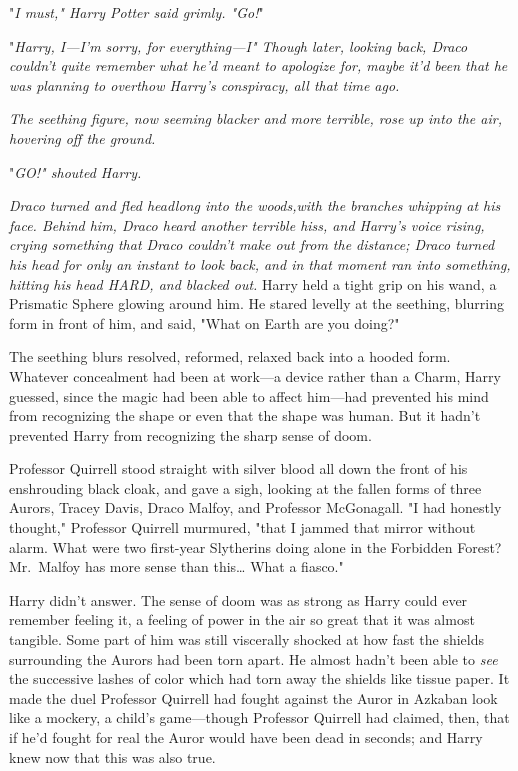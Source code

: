 "\emph{I must," Harry Potter said grimly. "Go!}"

"\emph{Harry, I---I'm sorry, for everything---I" Though later, looking back, 
Draco couldn't quite remember what he'd meant to apologize for, maybe it'd been 
that he was planning to overthow Harry's conspiracy, all that time ago.}

\emph{The seething figure, now seeming blacker and more terrible, rose up into 
the air, hovering off the ground.}

"\emph{GO!" shouted Harry.}

\emph{Draco turned and fled headlong into the woods,with the branches whipping 
at his face. Behind him, Draco heard another terrible hiss, and Harry's voice 
rising, crying something that Draco couldn't make out from the distance; Draco 
turned his head for only an instant to look back, and in that moment ran into 
something, hitting his head HARD, and blacked out.}
\sbreak
Harry held a tight grip on his wand, a Prismatic Sphere glowing around him. He 
stared levelly at the seething, blurring form in front of him, and said, "What 
on Earth are you doing?"

The seething blurs resolved, reformed, relaxed back into a hooded form. 
Whatever concealment had been at work---a device rather than a Charm, Harry 
guessed, since the magic had been able to affect him---had prevented his mind 
from recognizing the shape or even that the shape was human. But it hadn't 
prevented Harry from recognizing the sharp sense of doom.

Professor Quirrell stood straight with silver blood all down the front of his 
enshrouding black cloak, and gave a sigh, looking at the fallen forms of three 
Aurors, Tracey Davis, Draco Malfoy, and Professor McGonagall. "I had honestly 
thought," Professor Quirrell murmured, "that I jammed that mirror without 
alarm. What were two first-year Slytherins doing alone in the Forbidden Forest? 
Mr.~Malfoy has more sense than this{\ldots} What a fiasco."

Harry didn't answer. The sense of doom was as strong as Harry could ever 
remember feeling it, a feeling of power in the air so great that it was almost 
tangible. Some part of him was still viscerally shocked at how fast the shields 
surrounding the Aurors had been torn apart. He almost hadn't been able to 
\emph{see} the successive lashes of color which had torn away the shields like 
tissue paper. It made the duel Professor Quirrell had fought against the Auror 
in Azkaban look like a mockery, a child's game---though Professor Quirrell had 
claimed, then, that if he'd fought for real the Auror would have been dead in 
seconds; and Harry knew now that this was also true.

